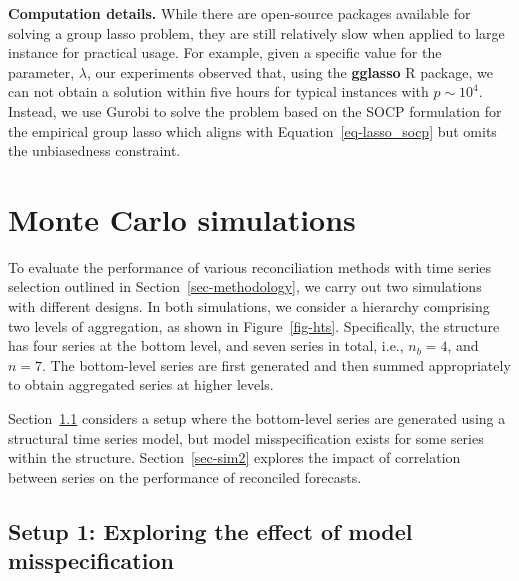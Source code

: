 \documentclass[
  12pt,
  11pt]{article}
\begin{document}
\textbf{Computation details.} While there are open-source packages
available for solving a group lasso problem, they are still relatively
slow when applied to large instance for practical usage. For example,
given a specific value for the parameter, \(\lambda\), our experiments
observed that, using the \textbf{gglasso} R package, we can not obtain a
solution within five hours for typical instances with \(p \sim 10^4\).
Instead, we use Gurobi to solve the problem based on the SOCP
formulation for the empirical group lasso which aligns with
Equation~\ref{eq-lasso_socp} but omits the unbiasedness constraint.

\hypertarget{sec-simulations}{%
\section{Monte Carlo simulations}\label{sec-simulations}}

To evaluate the performance of various reconciliation methods with time
series selection outlined in Section~\ref{sec-methodology}, we carry out
two simulations with different designs. In both simulations, we consider
a hierarchy comprising two levels of aggregation, as shown in
Figure~\ref{fig-hts}. Specifically, the structure has four series at the
bottom level, and seven series in total, i.e., \(n_b = 4\), and
\(n = 7\). The bottom-level series are first generated and then summed
appropriately to obtain aggregated series at higher levels.

Section~\ref{sec-sim1} considers a setup where the bottom-level series
are generated using a structural time series model, but model
misspecification exists for some series within the structure.
Section~\ref{sec-sim2} explores the impact of correlation between series
on the performance of reconciled forecasts.

\hypertarget{sec-sim1}{%
\subsection{Setup 1: Exploring the effect of model
misspecification}\label{sec-sim1}}
\end{document}
